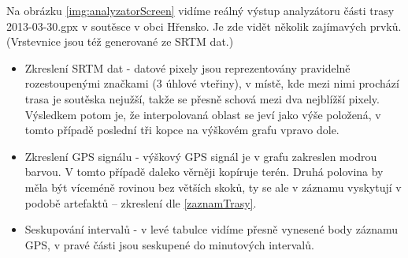 \documentclass[thesis=B,czech]{FITthesis}[2012/06/26]
\begin{document}
Na obrázku \ref{img:analyzatorScreen} vidíme reálný výstup analyzátoru části trasy 2013-03-30.gpx v soutěsce v obci Hřensko. Je zde vidět několik zajímavých prvků. (Vrstevnice jsou též generované ze SRTM dat.)
\begin{itemize}
\item{Zkreslení SRTM dat - datové pixely jsou reprezentovány pravidelně rozestoupenými značkami (3 úhlové vteřiny), v místě, kde mezi nimi prochází trasa je soutěska nejužší, takže se přesně schová mezi dva nejblížší pixely. Výsledkem potom je, že interpolovaná oblast se jeví jako výše položená, v tomto případě poslední tři kopce na výškovém grafu vpravo dole. }

\item{Zkreslení GPS signálu - výškový GPS signál je v grafu zakreslen modrou barvou. V tomto případě daleko věrněji kopíruje terén. Druhá polovina by měla být víceméně rovinou bez větších skoků, ty se ale v záznamu vyskytují v podobě artefaktů -- zkreslení dle \ref{zaznamTrasy}.}

\item{Seskupování intervalů - v levé tabulce vidíme přesně vynesené body záznamu GPS, v pravé části jsou seskupené do minutových intervalů.}

\end{itemize}
\end{document}
